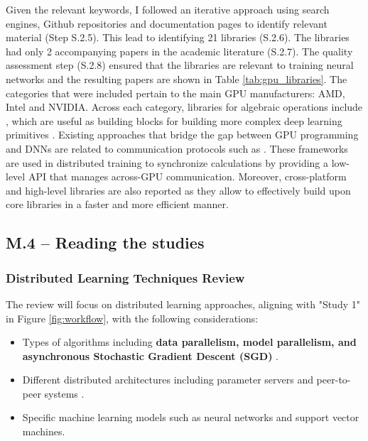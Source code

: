 Given the relevant keywords, I followed an iterative approach using search engines, Github
repositories and documentation pages to identify relevant material (Step S.2.5). This lead to
identifying 21 libraries (S.2.6). The libraries had only 2 accompanying papers
\cite{chetlur_cudnn_2014,okuta_cupy_2017} in the academic literature (S.2.7). The quality
assessment step (S.2.8) ensured that the libraries are relevant to training neural networks and the
resulting papers are shown in Table \ref{tab:gpu_libraries}. The categories that were included
pertain to the main GPU manufacturers: AMD, Intel and NVIDIA. Across each category, libraries for
algebraic operations include \cite{noauthor_cublas_nodate,noauthor_rocmrocblas_2025,
	noauthor_uxlfoundationonemath_2025}, which are useful as building blocks for building more complex
deep learning primitives
\cite{chetlur_cudnn_2014,noauthor_rocmmiopen_2025,onednn_contributors_oneapi_2025}. Existing
approaches that bridge the gap between GPU programming and DNNs are related to communication
protocols such as
\cite{noauthor_nvidianccl_2025,noauthor_rocmrccl_2025,noauthor_uxlfoundationoneccl_2025}. These
frameworks are used in distributed training to synchronize calculations by providing a low-level
API that manages across-GPU communication. Moreover, cross-platform and high-level libraries are
also reported as they allow to effectively build upon core libraries in a faster and more efficient
manner.

\subsection{M.4 -- Reading the studies}

\subsubsection{Distributed Learning Techniques Review}
The review will focus on distributed learning approaches, aligning with "Study 1" in Figure
\ref{fig:workflow}, with the following considerations:
\begin{itemize}
	\item Types of algorithms including \textbf{data parallelism, model parallelism, and asynchronous
		      Stochastic Gradient Descent (SGD)} \cite{ben-nun_demystifying_2020,langer_distributed_2020}.
	\item Different distributed architectures including parameter servers and peer-to-peer systems
	      \cite{verbraeken_survey_2021,ben-nun_demystifying_2020,langer_distributed_2020}.
	\item Specific machine learning models such as neural networks and support vector machines.
\end{itemize}

